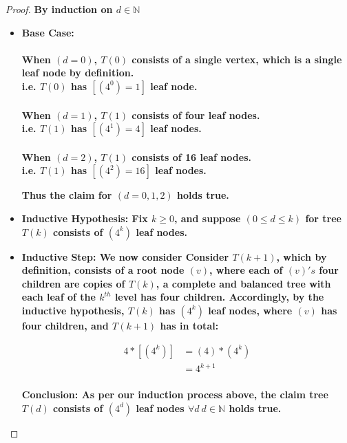 \documentclass[11pt]{article}
\theoremstyle{definition}
\theoremstyle{definition}
\theoremstyle{definition}
\newtheorem{ex}{Example}
\begin{document}
\begin{proof}\textbf{By induction on $d \in \mathbb{N}$}
\begin{itemize}

\item \textbf{Base Case: \\}
\\ \textbf{When $(d = 0)$, $T(0)$ consists of a single vertex, which is a single leaf node by definition. \\
i.e. $T(0)$ has $[(4^{0})=1]$ leaf node. \\}
\\ \textbf{When $(d = 1)$, $T(1)$ consists of four leaf nodes. \\
i.e. $T(1)$ has $[(4^{1})=4]$ leaf nodes. \\}
\\ \textbf{When $(d = 2)$, $T(1)$ consists of 16 leaf nodes. \\
i.e. $T(1)$ has $[(4^{2})=16]$ leaf nodes. \\}

\textbf{Thus the claim for $(d=0,1,2)$ holds true. \\}

\item \textbf{Inductive Hypothesis: Fix $k \geq 0$, and suppose $(0 \leq d \leq k)$ for tree $T(k)$ consists of $(4^{k})$ leaf nodes.}

\item \textbf{Inductive Step: We now consider Consider $T(k+1)$, which by definition, consists of a root node $(v)$, where each of $(v)'s$ four children are copies of $T(k)$, a complete and balanced tree with each leaf of the $k^{th}$ level has four children. Accordingly, by the inductive hypothesis, $T(k)$ has $(4^{k})$ leaf nodes, where $(v)$ has four children, and $T(k+1)$ has in total:}


\begin{align*}
4*[(4^{k})] &= (4)*(4^{k}) \\
&= 4^{k+1} \\
\end{align*}

\textbf{Conclusion: As per our induction process above, the claim tree $T(d)$ consists of $(4^{d})$ leaf nodes $\forall d\ $$d \in \mathbb{N}$ holds true.}
\end{itemize}
\end{proof}

\end{document}
